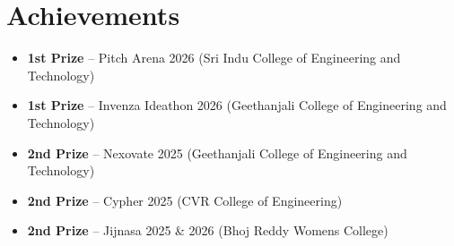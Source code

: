\documentclass[a4paper,10pt]{article}
\begin{document}
\section{Achievements}
\begin{itemize}
\item \textbf{1st Prize} -- Pitch Arena 2026 (Sri Indu College of Engineering and Technology)
\item \textbf{1st Prize} -- Invenza Ideathon 2026 (Geethanjali College of Engineering and Technology)
\item 
\textbf{2nd Prize} -- Nexovate 2025 (Geethanjali College of Engineering and Technology)
\item 
\textbf{2nd Prize} -- Cypher 2025 (CVR College of Engineering)
\item 
\textbf{2nd Prize} -- Jijnasa 2025 \& 2026 (Bhoj Reddy Womens College)
\end{itemize}
\end{document}
